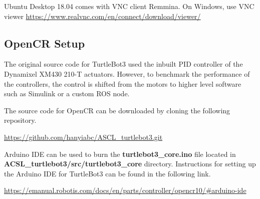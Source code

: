 \documentclass[12]{article}
\begin{document}
Ubuntu Desktop 18.04 comes with VNC client Remmina.
On Windows, use VNC viewer
\url{https://www.realvnc.com/en/connect/download/viewer/}
\subsection{OpenCR Setup}

The original source code for TurtleBot3 used the inbuilt PID controller of the Dynamixel XM430 210-T actuators. However, to benchmark the performance of the controllers, the control is shifted from the motors to higher level software such as Simulink or a custom ROS node.

The source code for OpenCR can be downloaded by cloning the following repository.

\url {https://github.com/hanyiabc/ASCL_turtlebot3.git}

Arduino IDE can be used to burn the \textbf{turtlebot3\_core.ino} file located in \textbf{ACSL\_turtlebot3/src/turtlebot3\_core} directory. Instructions for setting up the Arduino IDE for TurtleBot3 can be found in the following link.

\url {https://emanual.robotis.com/docs/en/parts/controller/opencr10/#arduino-ide}
\newpage
\end{document}
